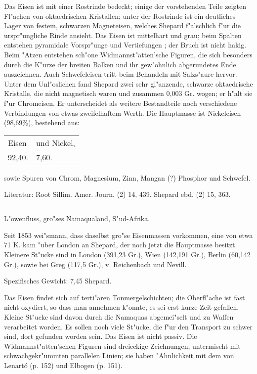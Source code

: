 \documentclass[a4paper, 11pt, oneside]{article}
\begin{document}
Das Eisen ist mit einer Rostrinde bedeckt; einige der vorstehenden Teile zeigten Fl"achen von oktaedrischen Kristallen; unter der Rostrinde ist ein deutliches Lager von festem, schwarzen Magneteisen, welches Shepard f"alschlich f"ur die urspr"ungliche Rinde ansieht. Das Eisen ist mittelhart und grau; beim Spalten entstehen pyramidale Vorspr"unge und Vertiefungen ; der Bruch ist nicht hakig. Beim "Atzen entstehen sch"one Widmannst"atten'sche Figuren, die sich besonders durch die K"urze der breiten Balken und ihr gew"ohnlich abgerundetes Ende auszeichnen. Auch Schwefeleisen tritt beim Behandeln mit Salzs"aure hervor. Unter dem Unl"oslichen fand Shepard zwei sehr gl"anzende, schwarze oktaedrische Kristalle, die nicht magnetisch waren und zusammen 0,003 Gr. wogen; er h"alt sie f"ur Chromeisen. Er unterscheidet als weitere Bestandteile noch verschiedene Verbindungen von etwas zweifelhaftem Werth. Die Hauptmasse ist Nickeleisen (98,69\%), bestehend aus:
\begin{table}[H]
    \centering\swabfamily\Large
    \begin{tabular}{l l}
        Eisen & und Nickel, \\
        92,40. & 7,60. \\
    \end{tabular}
\end{table}

sowie Spuren von Chrom, Magnesium, Zinn, Mangan (?) Phosphor und Schwefel.

\normalsize
Literatur: Root Sillim. Amer. Journ. (2) 14, 439. Shepard ebd. (2) 15, 363.

\subsection{}
\LARGE
\paragraph{}
L"owenfluss, gro"ses Namaqualand, S"ud-Afrika.

Seit 1853 wei"smann, dass daselbst gro"se Eisenmassen vorkommen, eine von etwa 71 K. kam "uber London an Shepard, der noch jetzt die Hauptmasse besitzt. Kleinere St"ucke sind in London (391,23 Gr.), Wien (142,191 Gr.), Berlin (60,142 Gr.), sowie bei Greg (117,5 Gr.), v. Reichenbach und Nevill.

Spezifisches Gewicht: 7,45 Shepard.

Das Eisen findet sich auf terti"aren Tonmergelschichten; die Oberfl"ache ist fast nicht oxydiert, so dass man annehmen k"onnte, es sei erst kurze Zeit gefallen. Kleine St"ucke sind davon durch die Namaquas abgemei"selt und zu Waffen verarbeitet worden. Es sollen noch viele St"ucke, die f"ur den Transport zu schwer sind, dort gefunden worden sein. Das Eisen ist nicht passiv. Die Widmannst"atten'schen Figuren sind dreieckige Zeichnungen, untermischt mit schwachgekr"ummten parallelen Linien; sie haben "Ahnlichkeit mit dem von Lenartó (p. 152) und Elbogen (p. 151).
\end{document}
